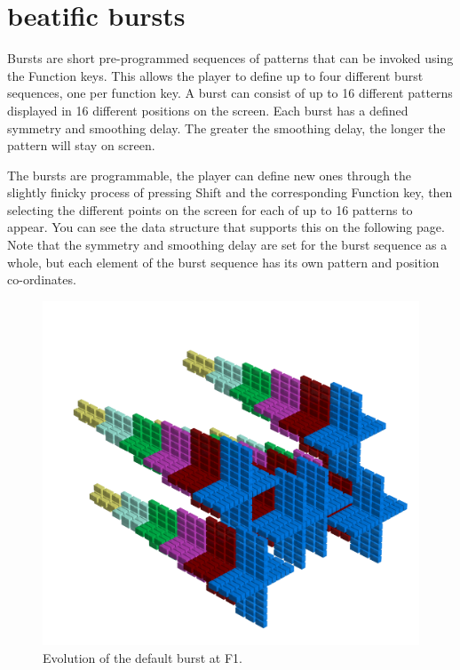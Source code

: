 \chapter{beatific bursts} 
\label{sec:bursts}
\rhead[]{\leftmark}
\lstset{style=6502Style}
Bursts are short pre-programmed sequences of patterns that can be invoked using the Function keys.
This allows the player to define up to four different burst sequences, one per function key. A burst
can consist of up to 16 different patterns displayed in 16 different positions on the screen. Each burst
has a defined symmetry and smoothing delay. The greater the smoothing delay, the longer the pattern
will stay on screen.

The bursts are programmable, the player can define new ones through the slightly finicky process of pressing
Shift and the corresponding Function key, then selecting the different points on the screen for each of up
to 16 patterns to appear. You can see the data structure that supports this on the following page. Note
that the symmetry and smoothing delay are set for the burst sequence as a whole, but each element of the
burst sequence has its own pattern and position co-ordinates.

\clearpage
\begin{figure}[H]
    \centering
    \begin{adjustbox}{width=12cm,center}
      \includegraphics[width=12cm]{src/patterns/bursts/pattern0-45.png}%
    \end{adjustbox}
\caption{Evolution of the default burst at F1.}
\end{figure}
\clearpage

